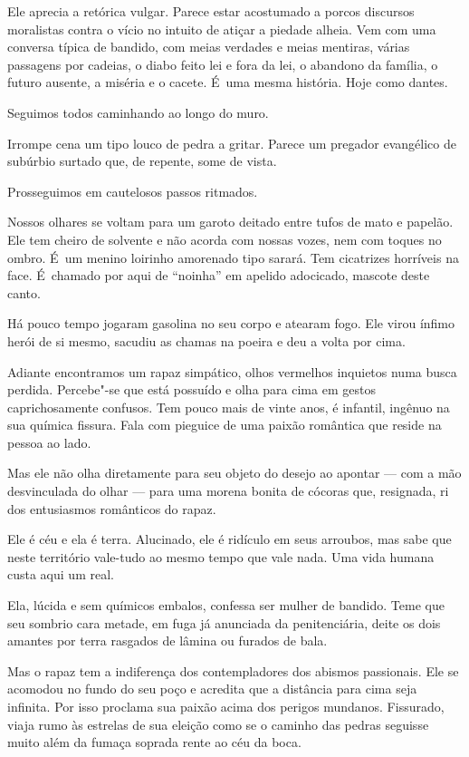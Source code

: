Ele aprecia a retórica vulgar. Parece estar acostumado a porcos
discursos moralistas contra o vício no intuito de atiçar a piedade
alheia. Vem com uma conversa típica de bandido, com meias verdades e
meias mentiras, várias passagens por cadeias, o diabo feito lei e fora
da lei, o abandono da família, o futuro ausente, a miséria e o cacete. É~uma mesma história. Hoje como dantes.

\asterisc{}

Seguimos todos caminhando ao longo do muro.

Irrompe cena um tipo louco de pedra a gritar. Parece um pregador
evangélico de subúrbio surtado que, de repente, some de vista.

Prosseguimos em cautelosos passos ritmados.

\asterisc{}

Nossos olhares se voltam para um garoto deitado entre tufos de mato e
papelão. Ele tem cheiro de solvente e não acorda com nossas vozes, nem
com toques no ombro. É~um menino loirinho amorenado tipo sarará. Tem
cicatrizes horríveis na face. É~chamado por aqui de ``noinha'' em
apelido adocicado, mascote deste canto.

Há pouco tempo jogaram gasolina no seu corpo e atearam fogo. Ele virou
ínfimo herói de si mesmo, sacudiu as chamas na poeira e deu a volta por
cima.

Adiante encontramos um rapaz simpático, olhos vermelhos inquietos numa
busca perdida. Percebe"-se que está possuído e olha para cima em gestos
caprichosamente confusos. Tem pouco mais de vinte anos, é infantil,
ingênuo na sua química fissura. Fala com pieguice de uma paixão
romântica que reside na pessoa ao lado.

Mas ele não olha diretamente para seu objeto do desejo ao apontar ---
com a mão desvinculada do olhar --- para uma morena bonita de cócoras
que, resignada, ri dos entusiasmos românticos do rapaz.

Ele é céu e ela é terra. Alucinado, ele é ridículo em seus arroubos, mas
sabe que neste território vale-tudo ao mesmo tempo que vale nada. Uma
vida humana custa aqui um real.

Ela, lúcida e sem químicos embalos, confessa ser mulher de bandido. Teme
que seu sombrio cara metade, em fuga já anunciada da penitenciária,
deite os dois amantes por terra rasgados de lâmina ou furados de bala.

Mas o rapaz tem a indiferença dos contempladores dos abismos passionais.
Ele se acomodou no fundo do seu poço e acredita que a distância para
cima seja infinita. Por isso proclama sua paixão acima dos perigos
mundanos. Fissurado, viaja rumo às estrelas de sua eleição como se o
caminho das pedras seguisse muito além da fumaça soprada rente ao céu da
boca.

